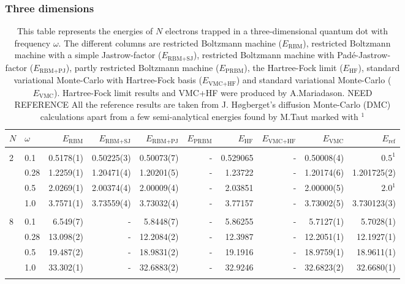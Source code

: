\begin{landscape}
\subsubsection{Three dimensions}
\begin{table} [H]
	\caption{This table represents the energies of $N$ electrons trapped in a three-dimensional quantum dot with frequency $\omega$. The different columns are restricted Boltzmann machine ($E_{\text{RBM}}$), restricted Boltzmann machine with a simple Jastrow-factor ($E_{\text{RBM+SJ}}$), restricted Boltzmann machine with Padé-Jastrow-factor ($E_{\text{RBM+PJ}}$), partly restricted Boltzmann machine ($E_{\text{PRBM}}$), the Hartree-Fock limit ($E_{\text{HF}}$), standard variational Monte-Carlo with Hartree-Fock basis ($E_{\text{VMC+HF}}$) and standard variational Monte-Carlo ($E_{\text{VMC}}$). Hartree-Fock limit results and VMC+HF were produced by A.Mariadason. NEED REFERENCE All the reference results are taken from J. Høgberget's diffusion Monte-Carlo (DMC) calculations apart from a few semi-analytical energies found by M.Taut marked with $^{1}$ \cite{taut_two_1993}\cite{hogberget_quantum_2013}} 
	\begin{tabularx}{\hsize}{l:l|RRRRRRRR} \hline\hline
		\label{tab:quantumdotswinteraction3D1}
		$N$ & $\omega$ & $E_{\text{RBM}}$ & $E_{\text{RBM+SJ}}$ & $E_{\text{RBM+PJ}}$ & $E_{\text{PRBM}}$ & $E_{\text{HF}}$ & $E_{\text{VMC+HF}}$ & $E_{\text{VMC}} $ & $E_{\text{ref}}$ \\ \hline \\
		2 & 0.1 & 0.5178(1) & 0.50225(3) & 0.50073(7) & - & 0.529065 & - & 0.50008(4) & $0.5^{1}$ \\
		& 0.28 & 1.2259(1) & 1.20471(4) & 1.20201(5) & - & 1.23722 & - & 1.20174(6) & 1.201725(2) \\
		& 0.5 & 2.0269(1) & 2.00374(4) & 2.00009(4) & - & 2.03851 & - & 2.00000(5) & $2.0^{1}$ \\
		& 1.0 & 3.7571(1) & 3.73559(4) & 3.73032(4) & - & 3.77157 & - & 3.73002(5) & 3.730123(3) \\ \hdashline \\
		
		8 & 0.1 & 6.549(7) & - & 5.8448(7) & - & 5.86255 & - & 5.7127(1) & 5.7028(1) \\ 
		& 0.28 & 13.098(2) & - & 12.2084(2) & - & 12.3987 & - & 12.2051(1) & 12.1927(1) \\
		& 0.5 & 19.487(2) & - & 18.9831(2) & - & 19.1916 & - & 18.9759(1) & 18.9611(1) \\
		& 1.0 & 33.302(1) & - & 32.6883(2) & - & 32.9246 & - & 32.6823(2) & 32.6680(1) \\ \hdashline \\
		

\end{tabularx}
\end{table}
\end{landscape}
